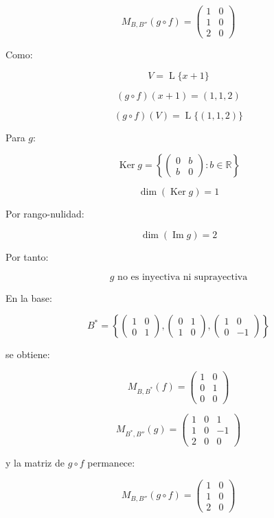 \documentclass[11pt,a4paper]{article}
\newcommand{\R}{\mathbb{R}}
\newcommand{\Ker}{\operatorname{Ker}}
\newcommand{\Ima}{\operatorname{Im}}
\newcommand{\Span}{\operatorname{L}}
\begin{document}
	\[
	\boxed{
	M_{B,B''}(g\circ f)
	=
	\begin{pmatrix}
	1&0\\
	1&0\\
	2&0
	\end{pmatrix}
	}
	\]

	Como:

	\[
	V=\Span\{x+1\}
	\]

	\[
	(g\circ f)(x+1)=(1,1,2)
	\]

	\[
	\boxed{
	(g\circ f)(V)
	=
	\Span\{(1,1,2)\}
	}
	\]

	Para $g$:

	\[
	\Ker g
	=
	\left\{
	\begin{pmatrix}
	0&b\\
	b&0
	\end{pmatrix}
	:b\in\R
	\right\}
	\]

	\[
	\boxed{
	\dim(\Ker g)=1
	}
	\]

	Por rango-nulidad:

	\[
	\boxed{
	\dim(\Ima g)=2
	}
	\]

	Por tanto:

	\[
	\boxed{
	g\text{ no es inyectiva ni suprayectiva}
	}
	\]

	En la base:

	\[
	B^*=
	\left\{
	\begin{pmatrix}1&0\\0&1\end{pmatrix},
	\begin{pmatrix}0&1\\1&0\end{pmatrix},
	\begin{pmatrix}1&0\\0&-1\end{pmatrix}
	\right\}
	\]

	se obtiene:

	\[
	\boxed{
	M_{B,B^*}(f)
	=
	\begin{pmatrix}
	1&0\\
	0&1\\
	0&0
	\end{pmatrix}
	}
	\]

	\[
	\boxed{
	M_{B^*,B''}(g)
	=
	\begin{pmatrix}
	1&0&1\\
	1&0&-1\\
	2&0&0
	\end{pmatrix}
	}
	\]

	y la matriz de $g\circ f$ permanece:

	\[
	\boxed{
	M_{B,B''}(g\circ f)
	=
	\begin{pmatrix}
	1&0\\
	1&0\\
	2&0
	\end{pmatrix}
	}
	\]
\end{document}
